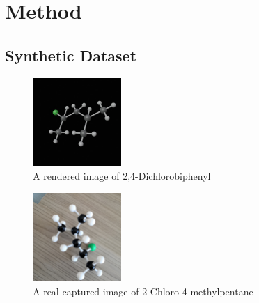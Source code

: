 \documentclass[conference]{IEEEtran}
\begin{document}



\section{Method}
\subsection{Synthetic Dataset}
\begin{figure}
    \centering
    \includegraphics[width=0.3\textwidth]{generated}
    \caption{A rendered image of 2,4-Dichlorobiphenyl}
    \label{fig:enter-label}
\end{figure}
\begin{figure}
    \centering
    \includegraphics[width=0.3\textwidth]{cap}
    \caption{A real captured image of 2-Chloro-4-methylpentane}
    \label{fig:enter-label}
\end{figure}
\end{document}
